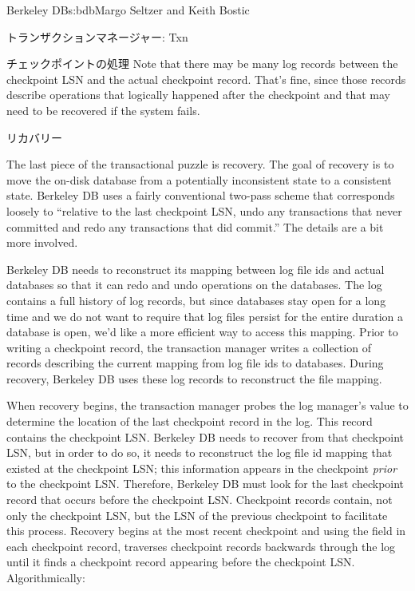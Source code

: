 \begin{aosachapter}{Berkeley DB}{s:bdb}{Margo Seltzer and Keith Bostic}
\begin{aosasect1}{トランザクションマネージャー: Txn}
\begin{aosasect2}{チェックポイントの処理}
Note that there may be many log records between the checkpoint LSN and
the actual checkpoint record.  That's fine, since those records describe
operations that logically happened after the checkpoint and that may
need to be recovered if the system fails.

\end{aosasect2}

\begin{aosasect2}{リカバリー}

The last piece of the transactional puzzle is recovery. The goal of
recovery is to move the on-disk database from a potentially
inconsistent state to a consistent state. Berkeley DB uses a fairly
conventional two-pass scheme that corresponds loosely to ``relative to
the last checkpoint LSN, undo any transactions that never committed
and redo any transactions that did commit.'' The details are a bit
more involved.

Berkeley DB needs to reconstruct its mapping between log file ids and
actual databases so that it can redo and undo operations on the
databases. The log contains a full history of 
log records, but since databases stay open for a long time and we do
not want to require that log files persist for the entire duration a
database is open, we'd like a more efficient way to access this
mapping. Prior to writing a checkpoint record, the transaction manager
writes a collection of  records describing the
current mapping from log file ids to databases.  During recovery,
Berkeley DB uses these log records to reconstruct the file mapping.

When recovery begins, the transaction manager probes the log manager's
 value to determine the location of the last
checkpoint record in the log. This record contains the checkpoint LSN.
Berkeley DB needs to recover from that checkpoint LSN, but in order to
do so, it needs to reconstruct the log file id mapping that existed at
the checkpoint LSN; this information appears in the checkpoint
\emph{prior} to the checkpoint LSN\@. Therefore, Berkeley DB must look
for the last checkpoint record that occurs before the checkpoint LSN.
Checkpoint records contain, not only the checkpoint LSN, but the LSN
of the previous checkpoint to facilitate this process. Recovery begins
at the most recent checkpoint and using the  field in
each checkpoint record, traverses checkpoint records backwards through
the log until it finds a checkpoint record appearing
before the checkpoint LSN\@. Algorithmically:


\end{aosasect2}
\end{aosasect1}
\end{aosachapter}
